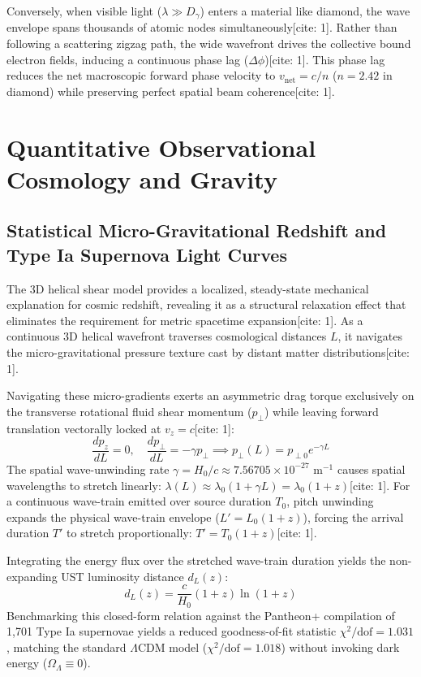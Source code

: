 \documentclass[11pt,a4paper]{article}
\begin{document}
	Conversely, when visible light ($\lambda \gg D_\gamma$) enters a material like diamond, the wave envelope spans thousands of atomic nodes simultaneously[cite: 1]. Rather than following a scattering zigzag path, the wide wavefront drives the collective bound electron fields, inducing a continuous phase lag ($\Delta \phi$)[cite: 1]. This phase lag reduces the net macroscopic forward phase velocity to $v_{\text{net}} = c/n$ ($n = 2.42$ in diamond) while preserving perfect spatial beam coherence[cite: 1].
	
	\section{Quantitative Observational Cosmology and Gravity}
	
	\subsection{Statistical Micro-Gravitational Redshift and Type Ia Supernova Light Curves}
	The 3D helical shear model provides a localized, steady-state mechanical explanation for cosmic redshift, revealing it as a structural relaxation effect that eliminates the requirement for metric spacetime expansion[cite: 1]. As a continuous 3D helical wavefront traverses cosmological distances $L$, it navigates the micro-gravitational pressure texture cast by distant matter distributions[cite: 1].
	
	Navigating these micro-gradients exerts an asymmetric drag torque exclusively on the transverse rotational fluid shear momentum ($p_\perp$) while leaving forward translation vectorally locked at $v_z = c$[cite: 1]:
	\begin{equation}
		\frac{dp_z}{dL} = 0, \quad \frac{dp_\perp}{dL} = -\gamma p_\perp \implies p_\perp(L) = p_{\perp 0} e^{-\gamma L}
	\end{equation}
	The spatial wave-unwinding rate $\gamma = H_0/c \approx 7.56705 \times 10^{-27}\text{ m}^{-1}$ causes spatial wavelengths to stretch linearly: $\lambda(L) \approx \lambda_0 (1 + \gamma L) = \lambda_0 (1 + z)$[cite: 1]. For a continuous wave-train emitted over source duration $T_0$, pitch unwinding expands the physical wave-train envelope ($L' = L_0(1+z)$), forcing the arrival duration $T'$ to stretch proportionally: $T' = T_0(1+z)$[cite: 1].
	
	Integrating the energy flux over the stretched wave-train duration yields the non-expanding UST luminosity distance $d_L(z)$:
	\begin{equation}
		d_L(z) = \frac{c}{H_0} (1+z) \ln(1+z)
	\end{equation}
	Benchmarking this closed-form relation against the Pantheon+ compilation of 1,701 Type Ia supernovae yields a reduced goodness-of-fit statistic $\chi^2/\text{dof} = 1.031$, matching the standard $\Lambda\text{CDM}$ model ($\chi^2/\text{dof} = 1.018$) without invoking dark energy ($\Omega_\Lambda \equiv 0$).
	
\end{document}
